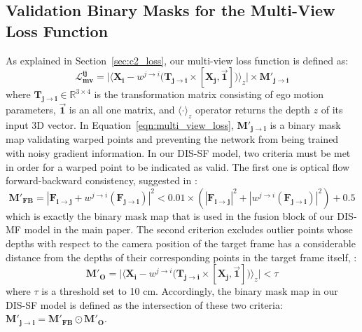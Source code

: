 \subsection{Validation Binary Masks for the Multi-View Loss Function} \label{sec:c2_binary_masks}
As explained in Section~\ref{sec:c2_loss}, our multi-view loss function is defined as:
\begin{equation} \label{eqn:multi_view_loss}
    \boldsymbol{\mathcal{L}^{ij}_{mv}}=
    \bigg|
    \Big \langle \boldsymbol{X_{i}} -
    w^{j \rightarrow i}
    \big( \boldsymbol{T_{j \rightarrow i}} \times [\boldsymbol{X_{j}},\vec{\mathbf{1}}] \big) \Big \rangle_z
    \bigg| \times \boldsymbol{M'_{j \rightarrow i}}
\end{equation}
where $\boldsymbol{T_{j \rightarrow i}} \in \mathbb{R}^{3 \times 4}$ is the transformation matrix consisting of ego motion parameters, $\vec{\mathbf{1}}$ is an all one matrix, and $\langle\cdot\rangle_z$ operator returns the depth $z$ of its input 3D vector. In Equation~\eqref{eqn:multi_view_loss}, $\boldsymbol{M'_{j \rightarrow i}}$ is a binary mask map validating warped points and preventing the network from being trained with noisy gradient information. In our DIS-SF model, two criteria must be met in order for a warped point to be indicated as valid. The first one is optical flow forward-backward consistency, suggested in \cite{zou2018df,meister2017unflow}:
\begin{equation}\label{eqn:supp_flow_forward_backward}
    \boldsymbol{M'_{FB}} = |\boldsymbol{F_{i \rightarrow j}} + w^{j \rightarrow i}(\boldsymbol{F_{j \rightarrow i}})|^2 < 0.01 \times (|\boldsymbol{F_{i \rightarrow j}}|^2 + |w^{j \rightarrow i}(\boldsymbol{F_{j \rightarrow i}})|^2) + 0.5
\end{equation}
which is exactly the binary mask map that is used in the fusion block of our DIS-MF model in the main paper. The second criterion excludes outlier points whose depths with respect to the camera position of the target frame has a considerable distance from the depths of their corresponding points in the target frame itself, \ie:
\begin{equation}
    \boldsymbol{M'_{O}} = \bigg|
    \Big \langle \boldsymbol{X_{i}} -
    w^{j \rightarrow i}
    \big( \boldsymbol{T_{j \rightarrow i}} \times [\boldsymbol{X_{j}},\vec{\mathbf{1}}] \big) \Big \rangle_z
    \bigg| < \tau
\end{equation}
where $\tau$ is a threshold set to 10 cm. Accordingly, the binary mask map in our DIS-SF model is defined as the intersection of these two criteria: $\boldsymbol{M'_{j \rightarrow i}} = \boldsymbol{M'_{FB}} \odot \boldsymbol{M'_{O}}$.

